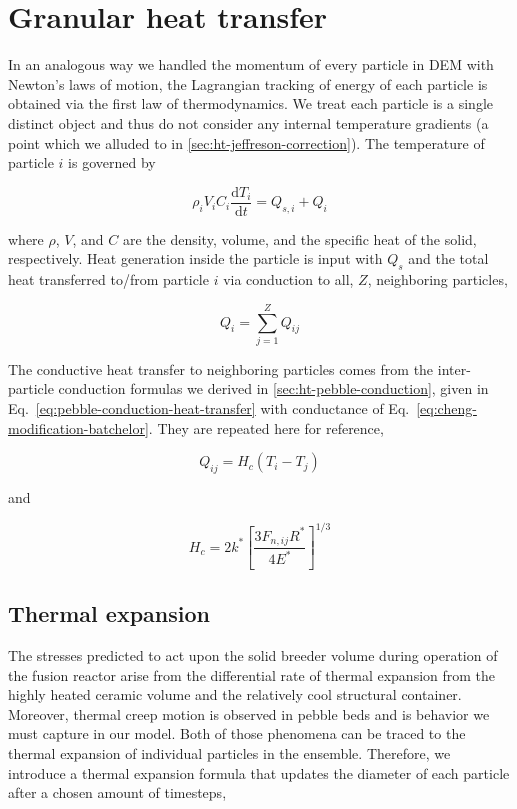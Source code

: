 \section{Granular heat transfer}\label{sec:dem-heat-transfer}

In an analogous way we handled the momentum of every particle in DEM with Newton's laws of motion, the Lagrangian tracking of energy of each particle is obtained via the first law of thermodynamics. We treat each particle is a single distinct object and thus do not consider any internal temperature gradients (a point which we alluded to in \cref{sec:ht-jeffreson-correction}). The temperature of particle $i$ is governed by

\begin{equation}\label{eq:thermoFirstLaw}
	\rho_iV_iC_i\frac{\mathrm{d}T_i}{\mathrm{d}t} = Q_{s,i} + Q_{i}
\end{equation}

where $\rho$, $V$, and $C$ are the density, volume, and the specific heat of the solid, respectively. Heat generation inside the particle is input with $Q_{s}$ and the total heat transferred to/from particle $i$ via conduction to all, $Z$, neighboring particles,

\begin{equation}
	Q_i = \sum_{j=1}^Z Q_{ij}
\end{equation}

The conductive heat transfer to neighboring particles comes from the inter-particle conduction formulas we derived in \cref{sec:ht-pebble-conduction}, given in Eq.~\ref{eq:pebble-conduction-heat-transfer} with conductance of Eq.~\ref{eq:cheng-modification-batchelor}. They are repeated here for reference,

\begin{equation*}
	Q_{ij} = H_c(T_i - T_j)
\end{equation*} 

and

\begin{equation*}
	H_c= 2k^*\left[\frac{3F_{n,ij}R^*}{4E^*}\right]^{1/3}
\end{equation*}

\subsection{Thermal expansion}
The stresses predicted to act upon the solid breeder volume during operation of the fusion reactor arise from the differential rate of thermal expansion from the highly heated ceramic volume and the relatively cool structural container. Moreover, thermal creep motion is observed in pebble beds\cite{Tanigawa:2010cr, Vargas2007, Chen2009, Divoux2008} and is behavior we must capture in our model. Both of those phenomena can be traced to the thermal expansion of individual particles in the ensemble. Therefore, we introduce a thermal expansion formula that updates the diameter of each particle after a chosen amount of timesteps,

